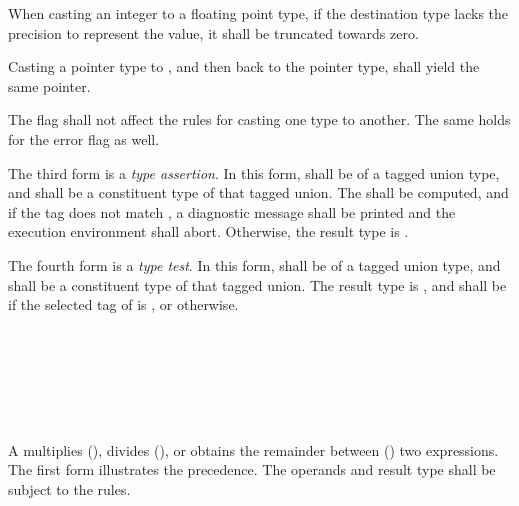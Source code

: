 \specsubsubitem
When casting an integer to a floating point type, if the destination type
lacks the precision to represent the value, it shall be truncated towards zero.

\specsubsubitem
Casting a pointer type to , and then back to the pointer
type, shall yield the same pointer.


\specsubsubitem
The  flag shall not affect the rules for casting one type to
another. The same holds for the error flag as well.

\specsubsubitem
The third form is a \textit{type assertion}. In this form,
 shall be of a tagged union type, and
 shall be a constituent type of that tagged union. The
 shall be computed, and if the tag does not match
, a diagnostic message shall be printed and the execution
environment shall abort. Otherwise, the result type is .

\specsubsubitem
The fourth form is a \textit{type test}. In this form,
 shall be of a tagged union type, and
 shall be a constituent type of that tagged union. The result
type is , and shall be  if the selected tag of
 is , or 
otherwise.


\begin{grammar}
 \\
	 \\
	 \terminal{*}  \\
	 \terminal{/}  \\
	 \terminal{\%}  \\
\end{grammar}

\specsubsubitem
A  multiplies (\terminal{*}), divides
(\terminal{/}), or obtains the remainder between (\terminal{\%}) two
expressions. The first form illustrates the precedence. The operands and result
type shall be subject to the  rules.

